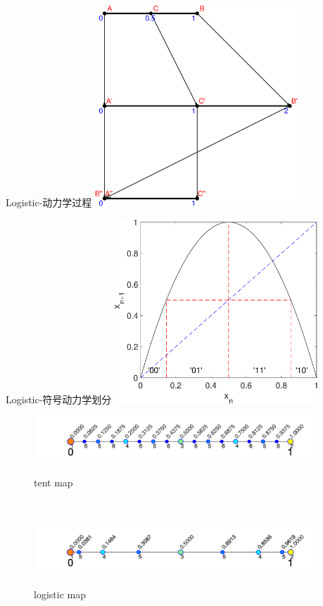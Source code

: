 \documentclass{beamer}
\begin{document}
		\begin{frame}{Logistic-动力学过程}
			\centering
			\includegraphics[width=3in]{images/Logistic_dynamic}
		\end{frame}
      \begin{frame}{Logistic-符号动力学划分}
      	\centering
      	\includegraphics[width=3in]{images/02c-Logistic_symbolic}
      \end{frame}
      \begin{frame}
      	\begin{figure}
      		\begin{minipage}{0.9\linewidth}
      			\centerline{\includegraphics[width=4.2in]{images/Tent_boundary.png}}
      			\centerline{tent map}
      		\end{minipage}
      		\\
      		\begin{minipage}{0.9\linewidth}
      			\centerline{\includegraphics[width=4.2in]{images/Logistic_boundary.png}}
      			\centerline{logistic map}
      		\end{minipage}
      	\end{figure}
      \end{frame}
\end{document}
